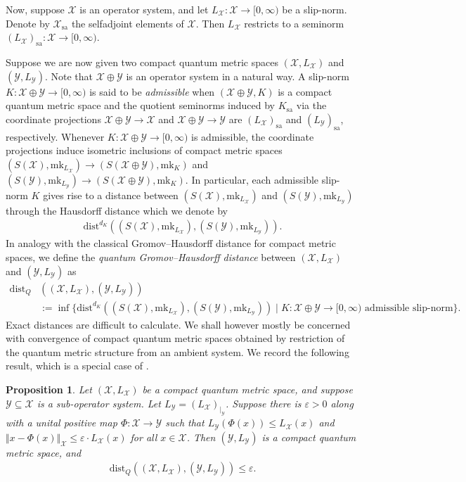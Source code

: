 \documentclass[11pt,a4paper,oneside,final,reqno]{amsart}
\newtheorem{proposition}[lemma]{Proposition}
\theoremstyle{definition}
\newcommand{\cX}{\mathcal{X}}
\newcommand{\cY}{\mathcal{Y}}
\newcommand{\mk}{\mathrm{mk}}
\numberwithin{equation}{section}
\begin{document}
	Now, 
	suppose $\cX$ is an operator system, and let $L_\cX\colon \cX \to [0,\infty)$ be a slip-norm.   Denote by $\cX_{\mathrm{sa}}$  the selfadjoint elements of $\cX$. Then $L_\cX$ restricts to a seminorm $(L_\cX)_{\mathrm{sa}} \colon \cX \to [0,\infty)$. 
	
	Suppose we are now given two compact quantum metric spaces $(\cX, L_\cX)$ and $(\cY, L_\cY)$. Note that $\cX \oplus \cY$ is an operator system in a natural way. 
	A slip-norm $K \colon \cX \oplus \cY \to [0,\infty)$ is said to be \emph{admissible} when $(\cX \oplus \cY, K)$ is a compact quantum metric space and the quotient seminorms induced by $K_\mathrm{sa}$ via the coordinate projections $\cX \oplus \cY \to \cX$ and $\cX \oplus \cY \to \cY$ are  $(L_\cX)_\mathrm{sa}$ and $(L_\cY)_\mathrm{sa}$, respectively. 
	Whenever $K \colon \cX \oplus \cY \to [0,\infty)$ is admissible, the coordinate projections induce isometric inclusions of compact metric spaces $(S(\cX), \mk_{L_{\cX}}) \to (S(\cX \oplus \cY), \mk_{K})$ and $(S(\cY), \mk_{L_{\cY}}) \to (S(\cX \oplus \cY), \mk_K)$. In particular, each admissible slip-norm $K$ gives rise to a distance between $(S(\cX), \mk_{L_{\cX}})$ and $(S(\cY), \mk_{L_{\cY}})$ through the Hausdorff distance which we denote by
	\begin{align*}
		\mathrm{dist}^{d_K}((S(\cX), \mk_{L_{\cX}}), (S(\cY), \mk_{L_{\cY}})).
	\end{align*}
	In analogy with the classical Gromov--Hausdorff distance for compact metric spaces, we define the \emph{quantum Gromov--Hausdorff distance} between $(\cX, L_\cX)$ and $(\cY, L_\cY)$ as
	\begin{align*}
		\mathrm{dist}_Q &((\cX, L_\cX), (\cY, L_\cY))\\ &:= \inf \{ \mathrm{dist}^{d_K}((S(\cX), \mk_{L_{\cX}}), (S(\cY), \mk_{L_{\cY}})) \mid K \colon \cX \oplus \cY \to [0, \infty) \text{ admissible slip-norm}  \}.
	\end{align*}
	Exact distances are difficult to calculate. We shall however mostly be concerned with convergence of compact quantum metric spaces obtained by restriction of the quantum metric structure from an ambient system. 
	We record the following result, which is a special case of \cite[Corollary 2.2.5]{KaadKyedSU2}. 
	\begin{proposition}\label{prop:KK-subsystem-qGH-convergence}
		Let $(\cX, L_\cX)$ be a compact quantum metric space, and suppose $\cY \subseteq \cX$ is a sub-operator system. Let $L_\cY = (L_\cX)_{ \vert_{\cY}}$. Suppose there is $\varepsilon > 0$ along with a unital positive map $\Phi \colon \cX \to \cY$ such that $L_\cY (\Phi (x)) \leq L_\cX (x)$ and $\Vert x - \Phi(x)\Vert_\cX \leq \varepsilon \cdot L_{\cX} (x)$ for all $x \in \cX$. Then $(\cY, L_\cY)$ is a compact quantum metric space, and
		\begin{align*}
			\mathrm{dist}_Q ((\cX, L_\cX), (\cY, L_\cY)) \leq  \varepsilon.
		\end{align*} 
	\end{proposition}
	
\end{document}
